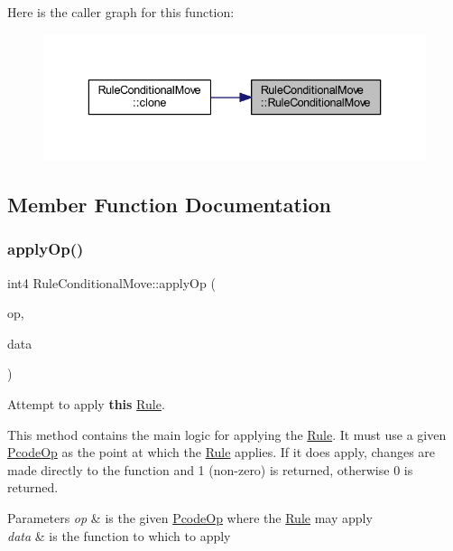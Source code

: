 Here is the caller graph for this function\+:
\nopagebreak
\begin{figure}[H]
\begin{center}
\leavevmode
\includegraphics[width=336pt]{class_rule_conditional_move_aa2aa312620374a34b57c723c82aec169_icgraph}
\end{center}
\end{figure}


\subsection{Member Function Documentation}
\mbox{\label{class_rule_conditional_move_a6f63597a783571c793f91a046166845b}} 
\subsubsection{\texorpdfstring{applyOp()}{applyOp()}}
{\footnotesize\ttfamily int4 Rule\+Conditional\+Move\+::apply\+Op (\begin{DoxyParamCaption}\item[{\mbox{\hyperlink{class_pcode_op}{Pcode\+Op}} $\ast$}]{op,  }\item[{\mbox{\hyperlink{class_funcdata}{Funcdata}} \&}]{data }\end{DoxyParamCaption})\hspace{0.3cm}{\ttfamily [virtual]}}



Attempt to apply {\bfseries{this}} \mbox{\hyperlink{class_rule}{Rule}}. 

This method contains the main logic for applying the \mbox{\hyperlink{class_rule}{Rule}}. It must use a given \mbox{\hyperlink{class_pcode_op}{Pcode\+Op}} as the point at which the \mbox{\hyperlink{class_rule}{Rule}} applies. If it does apply, changes are made directly to the function and 1 (non-\/zero) is returned, otherwise 0 is returned. 
\begin{DoxyParams}{Parameters}
{\em op} & is the given \mbox{\hyperlink{class_pcode_op}{Pcode\+Op}} where the \mbox{\hyperlink{class_rule}{Rule}} may apply \\
\hline
{\em data} & is the function to which to apply \\
\hline
\end{DoxyParams}


